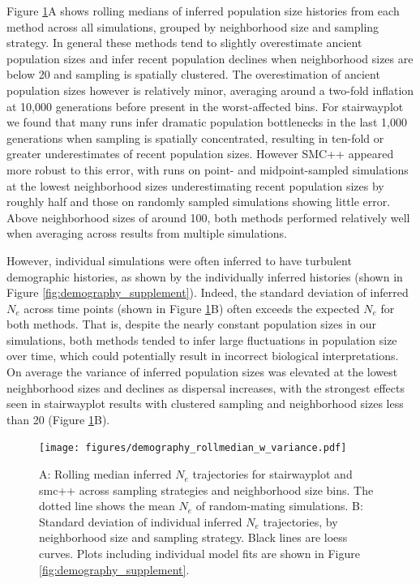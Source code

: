 \documentclass[10pt,twoside,lineno,hidelinks]{preprint}
\begin{document}
Figure \ref{fig:demography}A shows rolling medians of inferred population size histories from each method across all simulations, grouped by neighborhood size and sampling strategy.
In general these methods tend to slightly overestimate ancient population sizes and infer recent population declines when neighborhood sizes are below 20 and sampling is spatially clustered.
The overestimation of ancient population sizes however is relatively minor, averaging around a two-fold inflation at 10,000 generations before present in the worst-affected bins. For stairwayplot we found that many runs infer dramatic population bottlenecks in the last 1,000 generations when sampling is spatially concentrated, resulting in ten-fold or greater underestimates of recent population sizes. However SMC++ appeared more robust to this error, with runs on point- and midpoint-sampled simulations at the lowest neighborhood sizes underestimating recent population sizes by roughly half and those on randomly sampled simulations showing little error. Above neighborhood sizes of around 100, both methods performed relatively well when averaging across results from multiple simulations. 

However, individual simulations were often inferred to have turbulent demographic histories,
as shown by the individually inferred histories (shown in Figure \ref{fig:demography_supplement}).
Indeed, the standard deviation of inferred $N_{e}$ across time points (shown in Figure \ref{fig:demography}B) often exceeds the expected $N_{e}$ for both methods.
That is, despite the nearly constant population sizes in our simulations, both methods tended to infer large fluctuations in population size over time, which could potentially result in incorrect biological interpretations. On average the variance of inferred population sizes was elevated at the lowest neighborhood sizes and declines as dispersal increases, with the strongest effects seen in stairwayplot results with clustered sampling and neighborhood sizes less than 20 (Figure \ref{fig:demography}B). 

\begin{figure}[p]
\centering
\texttt{[image: figures/demography\_rollmedian\_w\_variance.pdf]}
\caption{A: Rolling median inferred $N_{e}$ trajectories for stairwayplot and smc++ across sampling strategies and neighborhood size bins. The dotted line shows the mean $N_{e}$ of random-mating simulations. B: Standard deviation of individual inferred $N_{e}$ trajectories, by neighborhood size and sampling strategy. Black lines are loess curves. Plots including individual model fits are shown in Figure \ref{fig:demography_supplement}.}
\label{fig:demography}
\end{figure}
\end{document}
